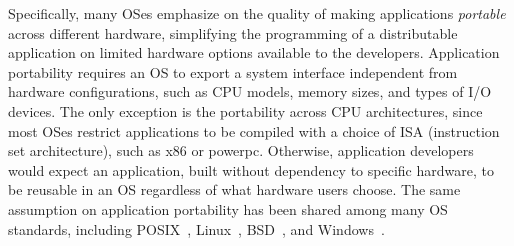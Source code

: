 Specifically, many OSes emphasize on the quality of making applications {\em portable} across different hardware,
simplifying the programming of a distributable application %
on limited hardware options available to the developers.
Application portability requires an OS to export a system interface
independent from hardware configurations, such as CPU models, memory sizes, and types of I/O devices.
The only exception is the portability across CPU architectures,
since most OSes restrict applications to be compiled with a choice of ISA (instruction set architecture), such as x86 or powerpc.
Otherwise, application developers would expect an application, built without dependency to specific hardware, to be reusable in an OS regardless of what hardware users choose.
The same assumption on application portability has been shared among many OS standards, including POSIX~\cite{ieee-posix}, Linux~\cite{linux-standard-base}, BSD~\cite{quarterman85bsd}, and Windows~\cite{win-api}. 



